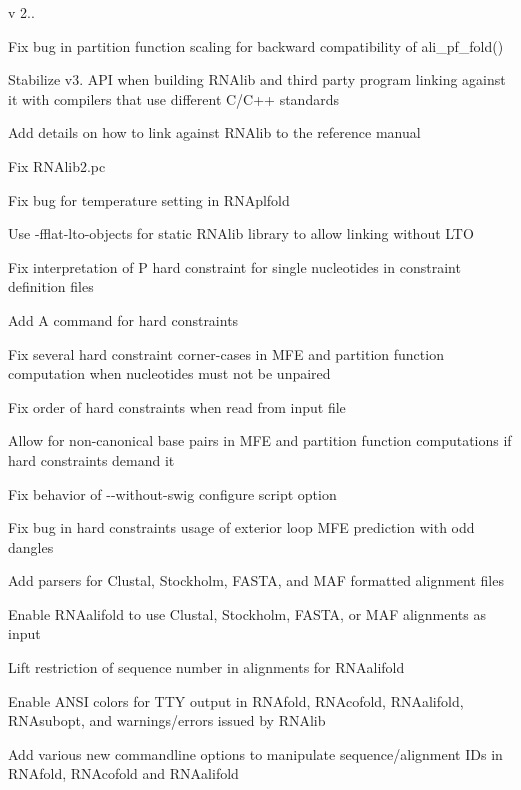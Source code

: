 v 2..
\begin{DoxyItemize}
\item Fix bug in partition function scaling for backward compatibility of ali\+\_\+pf\+\_\+fold()
\item Stabilize v3. A\+PI when building R\+N\+Alib and third party program linking against it with compilers that use different C/\+C++ standards
\item Add details on how to link against R\+N\+Alib to the reference manual
\item Fix R\+N\+Alib2.\+pc
\item Fix bug for temperature setting in R\+N\+Aplfold
\item Use -\/fflat-\/lto-\/objects for static R\+N\+Alib library to allow linking without L\+TO
\item Fix interpretation of \textquotesingle{}P\textquotesingle{} hard constraint for single nucleotides in constraint definition files
\item Add \textquotesingle{}A\textquotesingle{} command for hard constraints
\item Fix several hard constraint corner-\/cases in M\+FE and partition function computation when nucleotides must not be unpaired
\item Fix order of hard constraints when read from input file
\item Allow for non-\/canonical base pairs in M\+FE and partition function computations if hard constraints demand it
\item Fix behavior of -\/-\/without-\/swig configure script option
\item Fix bug in hard constraints usage of exterior loop M\+FE prediction with odd dangles
\item Add parsers for Clustal, Stockholm, F\+A\+S\+TA, and M\+AF formatted alignment files
\item Enable R\+N\+Aalifold to use Clustal, Stockholm, F\+A\+S\+TA, or M\+AF alignments as input
\item Lift restriction of sequence number in alignments for R\+N\+Aalifold
\item Enable A\+N\+SI colors for T\+TY output in R\+N\+Afold, R\+N\+Acofold, R\+N\+Aalifold, R\+N\+Asubopt, and warnings/errors issued by R\+N\+Alib
\item Add various new commandline options to manipulate sequence/alignment I\+Ds in R\+N\+Afold, R\+N\+Acofold and R\+N\+Aalifold
\end{DoxyItemize}

